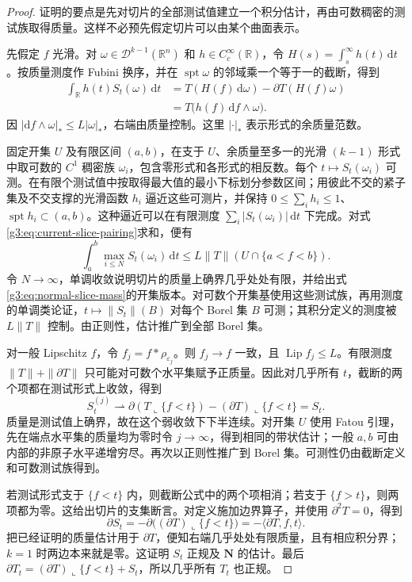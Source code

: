 \begin{proof}
	证明的要点是先对切片的全部测试值建立一个积分估计，再由可数稠密的测试族取得质量。这样不必预先假定切片可以由某个曲面表示。

	先假定 \(f\) 光滑。对 \(\omega\in\mathcal D^{k-1}(\mathbb R^n)\) 和 \(h\in C_c^\infty(\mathbb R)\)，令 \(H(s)=\int_s^\infty h(t)\,\mathrm dt\)。按质量测度作 Fubini 换序，并在 \(\operatorname{spt}\omega\) 的邻域乘一个等于一的截断，得到
	\begin{equation}\label{g3:eq:current-slice-pairing}
	\begin{aligned}
		\int_{\mathbb R}h(t)S_t(\omega)\,\mathrm dt
		&=T(H(f)\,\mathrm d\omega)-\partial T(H(f)\omega)\\
		&=T\bigl(h(f)\,\mathrm df\wedge\omega\bigr).
	\end{aligned}
	\end{equation}
	因 \(|\mathrm df\wedge\omega|_*\le L|\omega|_*\)，右端由质量控制。这里 \(|\cdot|_*\) 表示形式的余质量范数。

	固定开集 \(U\) 及有限区间 \((a,b)\)，在支于 \(U\)、余质量至多一的光滑 \((k-1)\) 形式中取可数的 \(C^1\) 稠密族 \(\omega_i\)，包含零形式和各形式的相反数。每个 \(t\mapsto S_t(\omega_i)\) 可测。在有限个测试值中按取得最大值的最小下标划分参数区间；用彼此不交的紧子集及不交支撑的光滑函数 \(h_i\) 逼近这些可测片，并保持 \(0\le\sum_i h_i\le1\)、\(\operatorname{spt}h_i\subset(a,b)\)。这种逼近可以在有限测度 \(\sum_i|S_t(\omega_i)|\,\mathrm dt\) 下完成。对式\eqref{g3:eq:current-slice-pairing}求和，便有
	\[
		\int_a^b\max_{i\le N}S_t(\omega_i)\,\mathrm dt
		\le L\|T\|(U\cap\{a<f<b\}).
	\]
	令 \(N\to\infty\)，单调收敛说明切片的质量上确界几乎处处有限，并给出式\eqref{g3:eq:normal-slice-mass}的开集版本。对可数个开集基使用这些测试族，再用测度的单调类论证，\(t\mapsto\|S_t\|(B)\) 对每个 Borel 集 \(B\) 可测；其积分定义的测度被 \(L\|T\|\) 控制。由正则性，估计推广到全部 Borel 集。

	对一般 Lipschitz \(f\)，令 \(f_j=f*\rho_{\varepsilon_j}\)。则 \(f_j\to f\) 一致，且 \(\operatorname{Lip}f_j\le L\)。有限测度 \(\|T\|+\|\partial T\|\) 只可能对可数个水平集赋予正质量。因此对几乎所有 \(t\)，截断的两个项都在测试形式上收敛，得到
	\[
		S_t^{(j)}\rightharpoonup
		\partial(T\llcorner\{f<t\})-(\partial T)\llcorner\{f<t\}=S_t.
	\]
	质量是测试值上确界，故在这个弱收敛下下半连续。对开集 \(U\) 使用 Fatou 引理，先在端点水平集的质量均为零时令 \(j\to\infty\)，得到相同的带状估计；一般 \(a,b\) 可由内部的非原子水平递增穷尽。再次以正则性推广到 Borel 集。可测性仍由截断定义和可数测试族得到。

	若测试形式支于 \(\{f<t\}\) 内，则截断公式中的两个项相消；若支于 \(\{f>t\}\)，则两项都为零。这给出切片的支集断言。对定义施加边界算子，并使用 \(\partial^2T=0\)，得到
	\[
		\partial S_t=-\partial\bigl((\partial T)\llcorner\{f<t\}\bigr)
		=-\langle\partial T,f,t\rangle.
	\]
	把已经证明的质量估计用于 \(\partial T\)，便知右端几乎处处有限质量，且有相应积分界；\(k=1\) 时两边本来就是零。这证明 \(S_t\) 正规及 \(\mathbf N\) 的估计。最后
	\(\partial T_t=(\partial T)\llcorner\{f<t\}+S_t\)，所以几乎所有 \(T_t\) 也正规。
\end{proof}

